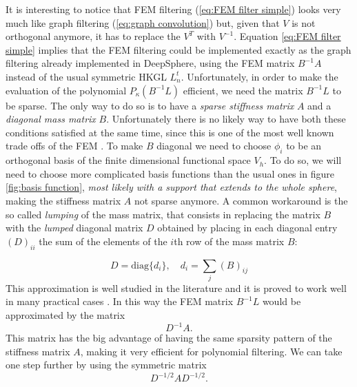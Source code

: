 It is interesting to notice that FEM filtering (\ref{eq:FEM filter simple}) looks very much like graph filtering (\ref{eq:graph convolution}) but, given that $V$ is not orthogonal anymore, it has to replace the $V^T$ with $V^{-1}$. Equation \ref{eq:FEM filter simple} implies that the FEM filtering could be implemented exactly as the graph filtering already implemented in DeepSphere, using the FEM matrix $B^{-1}A$ instead of the usual symmetric HKGL $L_n^t$. Unfortunately, in order to make the evaluation of the polynomial $P_\kappa(B^{-1}L)$ efficient, we need the matrix $B^{-1}L$ to be sparse. The only way to do so is to have a \textit{sparse stiffness matrix} $A$ and a \textit{diagonal mass matrix} $B$. Unfortunately there is no likely way to have both these conditions satisfied at the same time, since this is one of the most well known trade offs of the FEM \cite{Strang}. To make $B$ diagonal we need to choose $\phi_i$ to be an orthogonal basis of the finite dimensional functional space $V_h$. To do so, we will need to choose more complicated basis functions than the usual ones in figure \ref{fig:basis function}, \textit{most likely with a support that extends to the whole sphere}, making the stiffness matrix $A$ not sparse anymore. A common workaround \cite{Strang} is the so called \textit{lumping} of the mass matrix, that consists in replacing the matrix $B$ with the \textit{lumped} diagonal matrix $D$ obtained by placing in each diagonal entry $(D)_{ii}$ the sum of the elements of the $i$th row of the mass matrix $B$:

\begin{equation}\label{eq:lumping}
D = \text{diag}\{d_i\},\quad d_i = \sum_j (B)_{ij}
\end{equation}
This approximation is well studied in the literature and it is proved to work well in many practical cases \cite{Quarteroni:1639539}. In this way the FEM matrix $B^{-1}L$ would be approximated by the matrix
$$
D^{-1}A.
$$
This matrix has the big advantage of having the same sparsity pattern of the stiffness matrix $A$, making it very efficient for polynomial filtering. We can take one step further by using the symmetric matrix
$$
D^{-1/2}AD^{-1/2}.
$$



